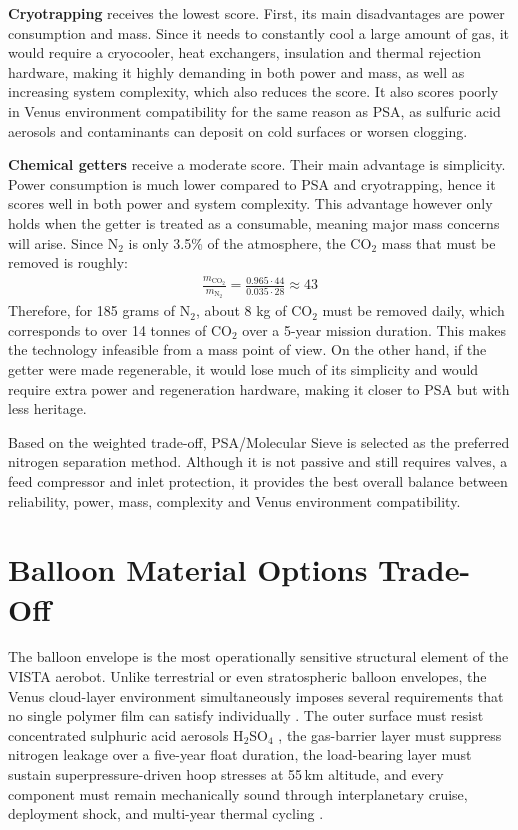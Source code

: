 \textbf{Cryotrapping} receives the lowest score. First, its main disadvantages are power consumption and mass. Since it needs to constantly cool a large amount of gas, it would require a cryocooler, heat exchangers, insulation and thermal rejection hardware, making it highly demanding in both power and mass, as well as increasing system complexity, which also reduces the score. It also scores poorly in Venus environment compatibility for the same reason as PSA, as sulfuric acid aerosols and contaminants can deposit on cold surfaces or worsen clogging.

\textbf{Chemical getters} receive a moderate score. Their main advantage is simplicity. Power consumption is much lower compared to PSA and cryotrapping, hence it scores well in both power and system complexity. This advantage however only holds when the getter is treated as a consumable, meaning major mass concerns will arise. Since N$_2$ is only 3.5\% of the atmosphere, the CO$_2$ mass that must be removed is roughly:
\begin{align}
    \frac{m_{\mathrm{CO_2}}}{m_{\mathrm{N_2}}}
    =
    \frac{0.965 \cdot 44}{0.035 \cdot 28}
    \approx 43
\end{align}
Therefore, for 185 grams of N$_2$, about 8 kg of CO$_2$ must be removed daily, which corresponds to over 14 tonnes of CO$_2$ over a 5-year mission duration. This makes the technology infeasible from a mass point of view. On the other hand, if the getter were made regenerable, it would lose much of its simplicity and would require extra power and regeneration hardware, making it closer to PSA but with less heritage.


Based on the weighted trade-off, PSA/Molecular Sieve is selected as the preferred nitrogen separation method. Although it is not passive and still requires valves, a feed compressor and inlet protection, it provides the best overall balance between reliability, power, mass, complexity and Venus environment compatibility.

\section{Balloon Material Options Trade-Off}

\noindent The balloon envelope is the most operationally sensitive structural element of the VISTA aerobot. Unlike terrestrial or even stratospheric balloon envelopes, the Venus cloud-layer environment simultaneously imposes several requirements that no single polymer film can satisfy individually \cite{yung2024planetaryvenus}. The outer surface must resist concentrated sulphuric acid aerosols H$_2$SO$_4$ \cite{delitsky2023cloudchemistryvenus}, the gas-barrier layer must suppress nitrogen leakage over a five-year float duration, the load-bearing layer must sustain superpressure-driven hoop stresses at 55\,km altitude, and every component must remain mechanically sound through interplanetary cruise, deployment shock, and multi-year thermal cycling \cite{Hall2007_VenusPrototype,Hall2009_SecondGen,Hall2011_TechDev}. 
\medskip

